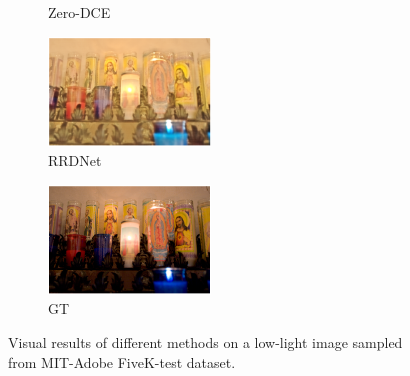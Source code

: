 \documentclass[letterpaper,12pt]{article}
\begin{document}
\begin{figure}[htbp]
\begin{subfigure}{0.18\textwidth}
			\captionsetup{font=scriptsize}
			\caption{Zero-DCE}
			\label{fig: MIT-Adobe_FiveK_m}  
		\end{subfigure}
		\begin{subfigure}{0.18\textwidth}
			\includegraphics[width=\linewidth]{MIT-Adobe_FiveK/RRDNet}
			\captionsetup{font=scriptsize}
			\caption{RRDNet}
			\label{fig: MIT-Adobe_FiveK_n}  
		\end{subfigure}
		\begin{subfigure}{0.18\textwidth}
			\includegraphics[width=\linewidth]{MIT-Adobe_FiveK/GT}
			\captionsetup{font=scriptsize}
			\caption{GT}
			\label{fig: MIT-Adobe_FiveK_o}  
		\end{subfigure}
		
		\captionsetup{font=scriptsize}
		\caption{
			\label{fig: Visual Result from MIT-Adobe FiveK dataset}
			Visual results of different methods on a low-light image sampled from MIT-Adobe FiveK-test dataset.
		}
	\end{figure}
	
\end{document}
